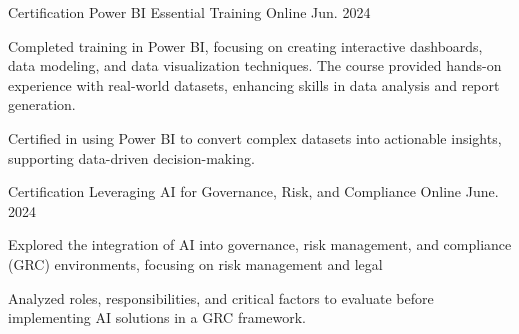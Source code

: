 

\begin{cventries}

\cventry
  {Certification} %
  {Power BI Essential Training} %
  {Online} %
  {Jun. 2024} %
  {
    \begin{cvitems} %
      \item {Completed training in Power BI, focusing on creating interactive dashboards, data modeling, and data visualization techniques. The course provided hands-on experience with real-world datasets, enhancing skills in data analysis and report generation.}
      \item {Certified in using Power BI to convert complex datasets into actionable insights, supporting data-driven decision-making.}
    \end{cvitems}
  }


\cventry
  {Certification} %
  {Leveraging AI for Governance, Risk, and Compliance} %
  {Online} %
  {June. 2024} %
  {
    \begin{cvitems} %
      \item {Explored the integration of AI into governance, risk management, and compliance (GRC) environments, focusing on risk management and legal }
      \item {Analyzed roles, responsibilities, and critical factors to evaluate before implementing AI solutions in a GRC framework.}
    \end{cvitems}
  }


\end{cventries}
